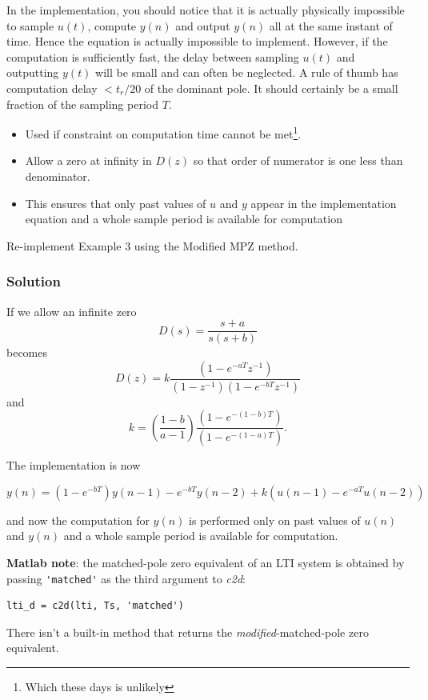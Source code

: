 In the implementation, you should notice that it is actually physically impossible
to sample $u(t)$, compute $y(n)$ and output $y(n)$ all at the same instant of time.
Hence the equation is actually impossible to implement. However, if the
computation is sufficiently fast, the delay between sampling $u(t)$ and outputting
$y(t)$ will be small and can often be neglected.
A rule of thumb has computation delay $< t_r/20$ of the dominant pole.
It should certainly be a small fraction of the sampling period $T$.

\begin{slide}\label{slides:l11s26}
	\begin{itemize}
	\item
	Used if constraint on computation time cannot be met\footnote{Which these days is unlikely}.

	\item Allow a zero at infinity in $D(z)$ so that order of numerator is one
  less than denominator.

	\item This ensures that only past values of $u$ and $y$ appear in the implementation
  equation and a whole sample period is available for computation

\end{itemize}
\end{slide}

\begin{slide}

Re-implement Example 3 using the Modified MPZ method.
\end{slide}
\subsubsection*{Solution}
If we allow an infinite zero
$$D(s)=\frac{s+a}{s(s+b)}$$ becomes
$$D(z)=k\frac{(1-e^{-aT}z^{-1})}{(1-z^{-1})(1-e^{-bT}z^{-1})}$$ and
$$k = \left( {\frac{{1 - b}}{{a - 1}}} \right)\frac{{\left( {1 - {e^{ - (1 - b)T}}} \right)}}{{\left( {1 - {e^{ - (1 - a)T}}} \right)}}.$$

The implementation is now

$$y(n) = (1 - e^{-bT})y(n-1)-e^{-bT}y(n-2)+k(u(n-1)-e^{-aT}u(n-2))$$

and now the computation for $y(n)$ is performed only on past values of $u(n)$ and
$y(n)$ and a whole sample period is available for computation.

\textbf{Matlab note}: the matched-pole zero equivalent of an LTI system is obtained by passing \verb|'matched'| as the third argument to \emph{c2d}:
\begin{verbatim}
lti_d = c2d(lti, Ts, 'matched')
\end{verbatim}
There isn't a built-in method that returns the \emph{modified}-matched-pole zero equivalent.


\endinput

